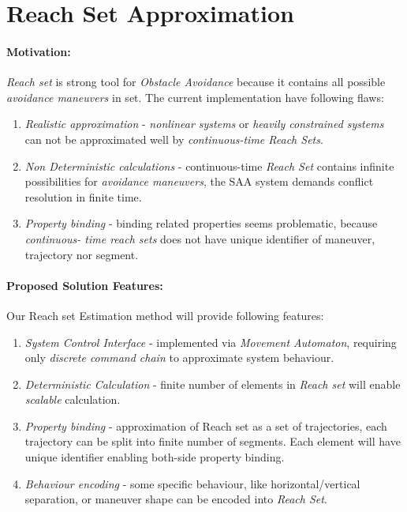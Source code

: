 \section{Reach Set Approximation}\label{s:reachSet}

    \noindent\paragraph{Motivation:} \emph{Reach set} is strong tool for \emph{Obstacle Avoidance} because it contains all possible \emph{avoidance maneuvers} in set. The current implementation have following flaws:
    
    \begin{enumerate}
        \item \emph{Realistic approximation} - \emph{nonlinear systems} or \emph{heavily constrained systems} can not be approximated well by \emph{continuous-time Reach Sets}.
        
        \item \emph{Non Deterministic calculations} - continuous-time \emph{Reach Set} contains  infinite possibilities for \emph{avoidance maneuvers}, the SAA system demands conflict resolution in finite time.
        
        \item \emph{Property binding} - binding related properties seems problematic, because \emph{continuous- time reach sets} does not have unique identifier of maneuver, trajectory nor segment. 
    \end{enumerate}
    
    \paragraph{Proposed Solution Features:} Our Reach set Estimation method will provide following features:
    
    \begin{enumerate}
        \item \emph{System Control Interface} - implemented via \emph{Movement Automaton}, requiring only \emph{discrete command chain} to approximate system behaviour.
        
        \item \emph{Deterministic Calculation} - finite number of elements in \emph{Reach set} will enable \emph{scalable} calculation.
        
        \item \emph{Property binding} - approximation of Reach set as a set of trajectories, each trajectory can be split into finite number of segments. Each element will have unique identifier enabling both-side  property binding.
        
        \item \emph{Behaviour encoding} - some specific behaviour, like horizontal/vertical separation, or maneuver shape can be encoded into \emph{Reach Set}.
    \end{enumerate}
    
